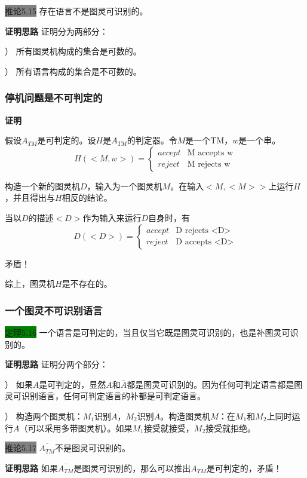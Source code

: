 \documentclass[a4paper]{article}
\begin{document}
	\colorbox{gray}{推论5.15} 存在语言不是图灵可识别的。
	
	\textbf{证明思路} \quad 证明分为两部分：
	
	） 所有图灵机构成的集合是可数的。
	
	） 所有语言构成的集合是不可数的。

\subsubsection{停机问题是不可判定的}
	
	\textbf{证明}
	
	假设$A_{TM}$是可判定的。设$H$是$A_{TM}$的判定器。令$M$是一个TM，$w$是一个串。
		$$H(<M,w>)=
		\begin{cases}
			accept& \text{M accepts w}\\
			reject& \text{M rejects w}
		\end{cases}$$
		
	构造一个新的图灵机$D$，输入为一个图灵机$M$。在输入$<M,<M>>$上运行$H$，并且得出与$H$相反的结论。
	
	当以$D$的描述$<D>$作为输入来运行$D$自身时，有
		$$D(<D>)=
		\begin{cases}
			accept& \text{D rejects <D>}\\
			reject& \text{D accepts <D>}
		\end{cases}$$
	
	矛盾！
	
	综上，图灵机$H$是不存在的。
	
\subsubsection{一个图灵不可识别语言}

	\colorbox{green}{定理5.16} 一个语言是可判定的，当且仅当它既是图灵可识别的，也是补图灵可识别的。
	
	\textbf{证明思路} 证明分两个部分：
	
	） 如果$A$是可判定的，显然$A$和$\overline{A}$都是图灵可识别的。因为任何可判定语言都是图灵可识别语言，任何可判定语言的补都是可判定语言。
	
	） 构造两个图灵机：$M_1$识别$A$，$M_2$识别$\overline{A}$。构造图灵机$M$：在$M_1$和$M_2$上同时运行$A$（可以采用多带图灵机）。如果$M_1$接受就接受，$M_2$接受就拒绝。
	
	\colorbox{gray}{推论5.17} $\overline{A_{TM}}$不是图灵可识别的。
	
	\textbf{证明思路} \quad 如果$\overline{A_{TM}}$是图灵可识别的，那么可以推出$A_{TM}$是可判定的，矛盾！
\end{document}
